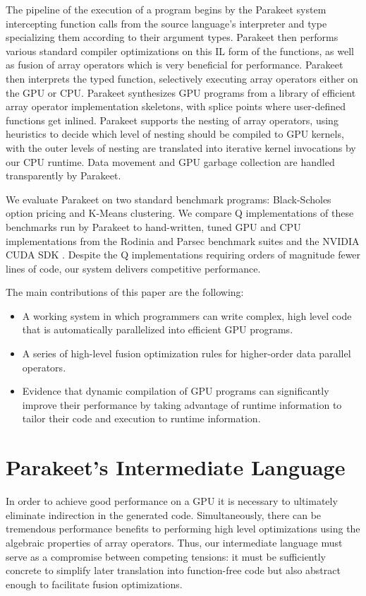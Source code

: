 \documentclass[preprint]{sigplanconf}
\begin{document}
The pipeline of the execution of a program begins by the Parakeet system
intercepting function calls from the source language's interpreter and type
specializing them according to their argument types.  Parakeet then performs
various standard compiler optimizations on this IL form of the functions, as
well as fusion of array operators which is very beneficial for performance.
Parakeet then interprets the typed function, selectively executing array
operators either on the GPU or CPU. Parakeet synthesizes GPU
programs from a library of efficient array operator implementation skeletons,
with splice points where user-defined functions get inlined. Parakeet supports
the nesting of array operators, using heuristics to decide which level of
nesting should be compiled to GPU kernels, with the outer levels of nesting are
translated into iterative kernel invocations by our CPU runtime.  Data movement
and GPU garbage collection are handled transparently by Parakeet.

We evaluate Parakeet on two standard benchmark programs: Black-Scholes option
pricing and K-Means clustering.  We compare Q implementations of these
benchmarks run by Parakeet to hand-written, tuned GPU and CPU implementations
from the Rodinia \cite{Che09} and Parsec \cite{Bien08} benchmark suites and the
NVIDIA CUDA SDK \cite{NvidSD}.  Despite the Q implementations requiring orders
of magnitude fewer lines of code, our system delivers competitive performance.

The main contributions of this paper are the following:

\begin{itemize}
\item A working system in which programmers can write complex, high level code
that is automatically parallelized into efficient GPU programs.
\item A series of high-level fusion optimization rules for higher-order data
parallel operators.
\item Evidence that dynamic compilation of GPU programs can significantly
improve their performance by taking advantage of runtime information to
tailor their code and execution to runtime information.
\end{itemize}


\section{Parakeet's Intermediate Language}
In order to achieve good performance on a GPU it is necessary to ultimately eliminate indirection in the generated code. Simultaneously, there can be tremendous performance benefits to performing high level optimizations using the algebraic properties of array operators. Thus, our intermediate language must serve as a compromise between competing tensions: it must be sufficiently concrete to simplify later translation into function-free code but also abstract enough to facilitate fusion optimizations.  \\
\end{document}
